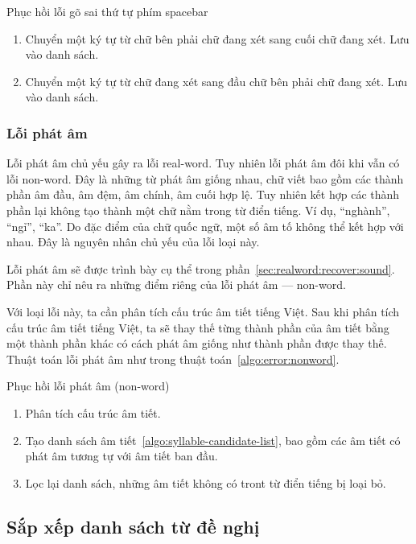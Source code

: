 \documentclass[a4paper,oneside,14pt]{extbook} %
\begin{document}
\begin{algo}\caption{Phục hồi lỗi gõ sai thứ tự phím spacebar}
  \begin{enumerate}
  \item Chuyển một ký tự từ chữ bên phải chữ đang xét sang cuối chữ đang
    xét. Lưu vào danh sách.
  \item Chuyển một ký tự từ chữ đang xét sang đầu chữ bên phải chữ đang
    xét. Lưu vào danh sách.
  \end{enumerate}
\end{algo}

\subsubsection{Lỗi phát âm}

Lỗi phát âm chủ yếu gây ra lỗi real-word. Tuy nhiên lỗi phát âm đôi
khi vẫn có lỗi non-word. Đây là những từ phát âm giống nhau, chữ viết
bao gồm các thành phần âm đầu, âm đệm, âm chính, âm cuối hợp lệ. Tuy
nhiên kết hợp các thành phần lại không tạo thành một chữ nằm trong từ
điển tiếng. Ví dụ, ``nghành'', ``ngỉ'', ``ka''. Do đặc điểm của chữ
quốc ngữ, một số âm tố không thể kết hợp với nhau. Đây là nguyên nhân
chủ yếu của lỗi loại này.

Lỗi phát âm sẽ được trình bày cụ thể trong
phần~\ref{sec:realword:recover:sound}. Phần này chỉ nêu ra những điểm
riêng của lỗi phát âm --- non-word.

Với loại lỗi này, ta cần phân tích cấu trúc âm tiết tiếng Việt. Sau
khi phân tích cấu trúc âm tiết tiếng Việt, ta sẽ thay thế từng thành
phần của âm tiết bằng một thành phần khác có cách phát âm giống như
thành phần được thay thế. Thuật toán lỗi phát âm như trong thuật
toán~\ref{algo:error:nonword}.
\begin{algo}
\caption{Phục hồi lỗi phát âm (non-word)}
\label{algo:error:nonword}
  \begin{enumerate}
  \item Phân tích cấu trúc âm tiết.
  \item Tạo danh sách âm tiết~\ref{algo:syllable-candidate-list}, bao
    gồm các âm tiết có phát âm tương tự với âm tiết ban đầu.
  \item Lọc lại danh sách, những âm tiết không có tront từ điển tiếng
    bị loại bỏ.
  \end{enumerate}
\end{algo}

\subsection{Sắp xếp danh sách từ đề nghị}
\label{sec:nonword:sort-candidates}
\end{document}
